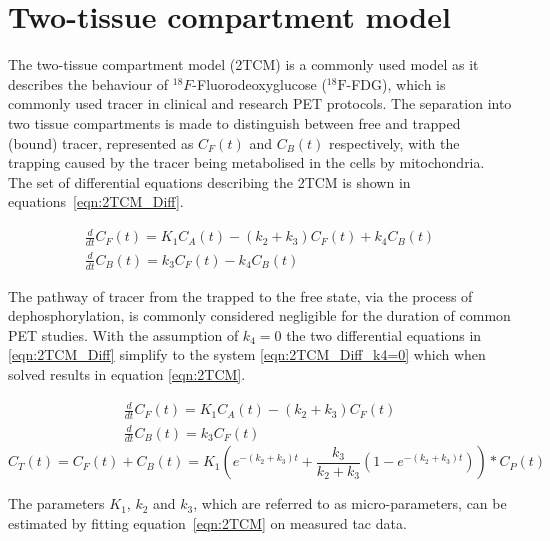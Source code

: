 \section{Two-tissue compartment model}
The two-tissue compartment model (2TCM) is a commonly used model as it describes the behaviour of ${}^{18}F$-Fluorodeoxyglucose (${}^{18}\mathrm{F}$-FDG), which is commonly used tracer in clinical and research PET protocols. The separation into two tissue compartments is made to distinguish between free and trapped (bound) tracer, represented as $C_F(t)$ and $C_B(t)$ respectively, with the trapping caused by the tracer being metabolised in the cells by mitochondria. The set of differential equations describing the 2TCM is shown in equations~\ref{eqn:2TCM_Diff}.

\begin{subequations}
\begin{align}
\frac{d}{dt}C_F(t) = K_1 C_A(t) - (k_2 + k_3)C_F(t) + k_4 C_B(t) \\ 
\frac{d}{dt}C_B(t) = k_3 C_F(t) - k_4 C_B(t)  
\end{align}
\label{eqn:2TCM_Diff}
\end{subequations}

The pathway of tracer from the trapped to the free state, via the process of dephosphorylation, is commonly considered negligible for the duration of common PET studies. With the assumption of $k_4=0$ the two differential equations in \ref{eqn:2TCM_Diff} simplify to the system \ref{eqn:2TCM_Diff_k4=0} which when solved results in equation \ref{eqn:2TCM}. 

\begin{subequations}
\begin{align}
\frac{d}{dt}C_F(t) = K_1 C_A(t) - (k_2 + k_3)C_F(t) \\ 
\frac{d}{dt}C_B(t) = k_3 C_F(t)  
\end{align}
\label{eqn:2TCM_Diff_k4=0}
\end{subequations}
%
\begin{equation}
C_T(t) =  C_F(t) + C_B(t) = K_1 ( e^{-(k_2+k_3)t} + \frac{k_3}{k_2+k_3}(1-e^{-(k_2+k_3)t})) \ast C_P(t)   
\label{eqn:2TCM}
\end{equation}

The parameters $K_1$, $k_2$ and $k_3$, which are referred to as micro-parameters, can be estimated by fitting equation~\ref{eqn:2TCM} on measured \gls{tac} data. 

